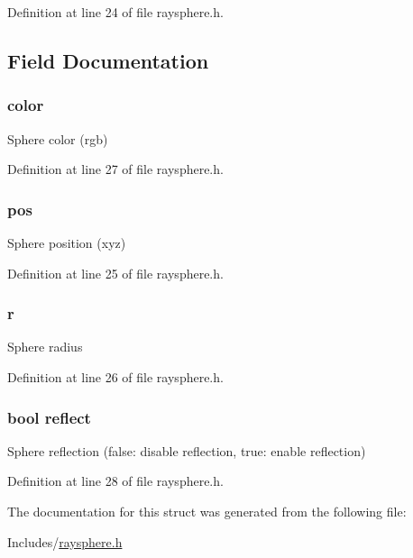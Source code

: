 Definition at line 24 of file raysphere.\+h.



\subsection{Field Documentation}
\subsubsection[{\texorpdfstring{color}{color}}]{ color}\hypertarget{structsphere_af1ec6dab64553dc67dc77bdc13deecb8}{}\label{structsphere_af1ec6dab64553dc67dc77bdc13deecb8}
Sphere color (rgb) 

Definition at line 27 of file raysphere.\+h.

\subsubsection[{\texorpdfstring{pos}{pos}}]{ pos}\hypertarget{structsphere_a81150a53dd49f693e71a6d68b213d99c}{}\label{structsphere_a81150a53dd49f693e71a6d68b213d99c}
Sphere position (xyz) 

Definition at line 25 of file raysphere.\+h.

\subsubsection[{\texorpdfstring{r}{r}}]{ r}\hypertarget{structsphere_a62fdcf65e893d786475a61de9f32f1e0}{}\label{structsphere_a62fdcf65e893d786475a61de9f32f1e0}
Sphere radius 

Definition at line 26 of file raysphere.\+h.

\subsubsection[{\texorpdfstring{reflect}{reflect}}]{\setlength{\rightskip}{0pt plus 5cm}bool reflect}\hypertarget{structsphere_ac89a0bd6b5d17bfe81528537757ff5d8}{}\label{structsphere_ac89a0bd6b5d17bfe81528537757ff5d8}
Sphere reflection (false\+: disable reflection, true\+: enable reflection) 

Definition at line 28 of file raysphere.\+h.



The documentation for this struct was generated from the following file\+:\begin{DoxyCompactItemize}
\item 
Includes/\hyperlink{raysphere_8h}{raysphere.\+h}\end{DoxyCompactItemize}
